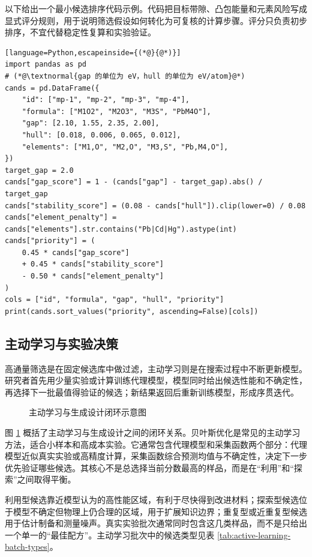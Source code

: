 以下给出一个最小候选排序代码示例。代码把目标带隙、凸包能量和元素风险写成显式评分规则，用于说明筛选假设如何转化为可复核的计算步骤。评分只负责初步排序，不宜代替稳定性复算和实验验证。


\begin{lstlisting}[language=Python,escapeinside={(*@}{@*)}]
import pandas as pd
# (*@\textnormal{gap 的单位为 eV，hull 的单位为 eV/atom}@*)
cands = pd.DataFrame({
    "id": ["mp-1", "mp-2", "mp-3", "mp-4"],
    "formula": ["M1O2", "M2O3", "M3S", "PbM4O"],
    "gap": [2.10, 1.55, 2.35, 2.00],
    "hull": [0.018, 0.006, 0.065, 0.012],
    "elements": ["M1,O", "M2,O", "M3,S", "Pb,M4,O"],
})
target_gap = 2.0
cands["gap_score"] = 1 - (cands["gap"] - target_gap).abs() / target_gap
cands["stability_score"] = (0.08 - cands["hull"]).clip(lower=0) / 0.08
cands["element_penalty"] = cands["elements"].str.contains("Pb|Cd|Hg").astype(int)
cands["priority"] = (
    0.45 * cands["gap_score"]
    + 0.45 * cands["stability_score"]
    - 0.50 * cands["element_penalty"]
)
cols = ["id", "formula", "gap", "hull", "priority"]
print(cands.sort_values("priority", ascending=False)[cols])
\end{lstlisting}


\subsection{主动学习与实验决策}

高通量筛选是在固定候选库中做过滤，主动学习则是在搜索过程中不断更新模型。研究者首先用少量实验或计算训练代理模型，模型同时给出候选性能和不确定性，再选择下一批最值得验证的候选；新结果返回后重新训练模型，形成序贯迭代。


\begin{figure}[H]
\centering
{}
\caption{主动学习与生成设计闭环示意图}
\label{fig:active-learning-generative-loop}
\end{figure}
\FloatBarrier

图 \ref{fig:active-learning-generative-loop} 概括了主动学习与生成设计之间的闭环关系。贝叶斯优化是常见的主动学习方法，适合小样本和高成本实验。它通常包含代理模型和采集函数两个部分：代理模型近似真实实验或高精度计算，采集函数综合预测均值与不确定性，决定下一步优先验证哪些候选。其核心不是总选择当前分数最高的样品，而是在“利用”和“探索”之间取得平衡。


利用型候选靠近模型认为的高性能区域，有利于尽快得到改进材料；探索型候选位于模型不确定但物理上仍合理的区域，用于扩展知识边界；重复型或近重复型候选用于估计制备和测量噪声。真实实验批次通常同时包含这几类样品，而不是只给出一个单一的“最佳配方”。主动学习批次中的候选类型见表 \ref{tab:active-learning-batch-types}。



